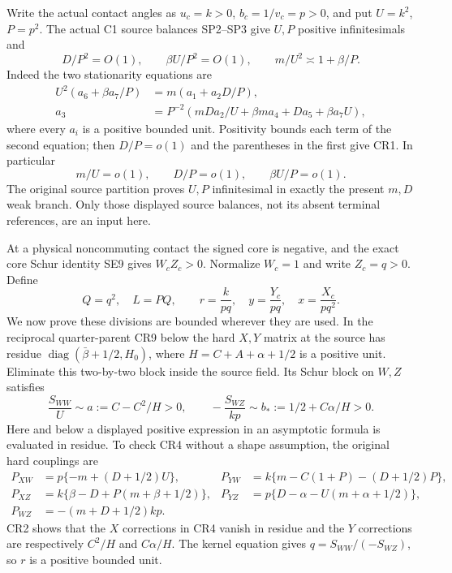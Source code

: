 Write the actual contact angles as $u_c=k>0$, $b_c=1/v_c=p>0$,
and put $U=k^2$, $P=p^2$. The actual C1 source balances SP2--SP3
give $U,P$ positive infinitesimals and
\[
 D/P^2=O(1),\qquad \beta U/P^2=O(1),\qquad
 m/U^2\asymp1+\beta/P.
 \tag{CR1}
\]
Indeed the two stationarity equations are
\[
\begin{aligned}
 U^2(a_6+\beta a_7/P)&=m(a_1+a_2D/P),\\
 a_3&=P^{-2}(mDa_2/U+\beta ma_4+Da_5+\beta a_7U),
\end{aligned}
\]
where every $a_i$ is a positive bounded unit. Positivity bounds
each term of the second equation; then $D/P=o(1)$ and the
parentheses in the first give CR1. In particular
\[
 m/U=o(1),\qquad D/P=o(1),\qquad \beta U/P=o(1).
 \tag{CR2}
\]
The original source partition proves $U,P$ infinitesimal in exactly
the present $m,D$ weak branch. Only those displayed source balances,
not its absent terminal references, are an input here.

At a physical noncommuting contact the signed core is negative, and
the exact core Schur identity SE9 gives $W_cZ_c>0$. Normalize $W_c=1$
and write $Z_c=q>0$. Define
\[
 Q=q^2,\quad L=PQ,\qquad
 r=\frac{k}{pq},\quad y=\frac{Y_c}{pq},\quad
 x=\frac{X_c}{pq^2}.
 \tag{CR3}
\]
We now prove these divisions are bounded wherever they are used.
In the reciprocal quarter-parent CR9 below the hard $X,Y$ matrix at
the source has residue
$\operatorname{diag}(\bar\beta+1/2,H_0)$, where
$H=C+A+\alpha+1/2$ is a positive unit. Eliminate this two-by-two
block inside the source field. Its Schur block on $W,Z$ satisfies
\[
 \frac{S_{WW}}{U}\sim a:=C-C^2/H>0,\qquad
 -\frac{S_{WZ}}{kp}\sim b_*:=1/2+C\alpha/H>0.
 \tag{CR4}
\]
Here and below a displayed positive expression in an asymptotic
formula is evaluated in residue. To check CR4 without a shape
assumption, the original hard couplings are
\[
\begin{aligned}
 P_{XW}&=p\{-m+(D+1/2)U\},&
 P_{YW}&=k\{m-C(1+P)-(D+1/2)P\},\\
 P_{XZ}&=k\{\beta-D+P(m+\beta+1/2)\},&
 P_{YZ}&=p\{D-\alpha-U(m+\alpha+1/2)\},\\
 P_{WZ}&=-(m+D+1/2)kp.
\end{aligned}
\]
CR2 shows that the $X$ corrections in CR4 vanish in residue and
the $Y$ corrections are respectively $C^2/H$ and $C\alpha/H$.
The kernel equation gives $q=S_{WW}/(-S_{WZ})$, so $r$ is a
positive bounded unit.

